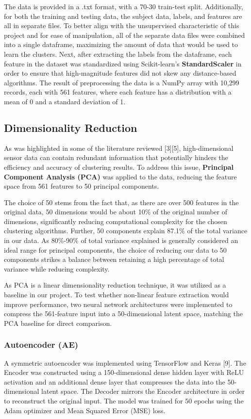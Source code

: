 \documentclass[12pt]{IEEEtran}
\begin{document}
The data is provided in a .txt format, with a 70-30 train-test split. Additionally, for both the training and testing data, the subject data, labels, and features are all in separate files. To better align with the unsupervised characteristic of this project and for ease of manipulation, all of the separate data files were combined into a single dataframe, maximizing the amount of data that would be used to learn the clusters. Next, after extracting the labels from the dataframe, each feature in the dataset was standardized using Scikit-learn's \textbf{StandardScaler} in order to ensure that high-magnitude features did not skew any distance-based algorithms. The result of preprocessing the data is a NumPy array with 10,299 records, each with 561 features, where each feature has a distribution with a mean of 0 and a standard deviation of 1.

\subsection{Dimensionality Reduction}
As was highlighted in some of the literature reviewed [3][5], high-dimensional sensor data can contain redundant information that potentially hinders the efficiency and accuracy of clustering results. To address this issue, \textbf{Principal Component Analysis (PCA)} was applied to the data, reducing the feature space from 561 features to 50 principal components. 

The choice of 50 stems from the fact that, as there are over 500 features in the original data, 50 dimensions would be about 10\% of the original number of dimensions, significantly reducing computational complexity for the chosen clustering algorithms. Further, 50 components explain 87.1\% of the total variance in our data. As 80\%-90\% of total variance explained is generally considered an ideal range for principal components, the choice of reducing our data to 50 components strikes a balance between retaining a high percentage of total variance while reducing complexity.

As PCA is a linear dimensionality reduction technique, it was utilized as a baseline in our project. To test whether non-linear feature extraction would improve performance,  two neural network architectures were implemented to compress the 561-feature input into a 50-dimensional latent space, matching the PCA baseline for direct comparison. 

\subsubsection{Autoencoder (AE)} A symmetric autoencoder was implemented using TensorFlow and Keras [9]. The Encoder was constructed using a 150-dimensional dense hidden layer with ReLU activation and an additional dense layer that compresses the data into the 50-dimensional latent space. The Decoder mirrors the Encoder architecture in order to reconstruct the original input. The model was trained for 50 epochs using the Adam optimizer and Mean Squared Error (MSE) loss.
\end{document}
